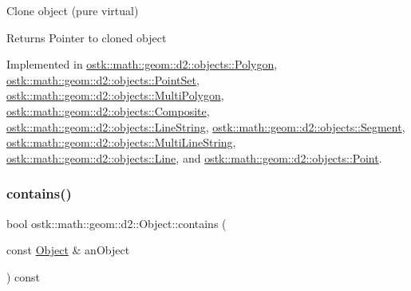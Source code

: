 Clone object (pure virtual) 

\begin{DoxyReturn}{Returns}
Pointer to cloned object 
\end{DoxyReturn}


Implemented in \hyperlink{classostk_1_1math_1_1geom_1_1d2_1_1objects_1_1_polygon_a55e4524d1f58bf8379580e63f49f0b48}{ostk\+::math\+::geom\+::d2\+::objects\+::\+Polygon}, \hyperlink{classostk_1_1math_1_1geom_1_1d2_1_1objects_1_1_point_set_ac1d1c3727df0f10f527aa3d3551c8f4e}{ostk\+::math\+::geom\+::d2\+::objects\+::\+Point\+Set}, \hyperlink{classostk_1_1math_1_1geom_1_1d2_1_1objects_1_1_multi_polygon_a89fdf23e9f496c2e5f598c0dc8981c86}{ostk\+::math\+::geom\+::d2\+::objects\+::\+Multi\+Polygon}, \hyperlink{classostk_1_1math_1_1geom_1_1d2_1_1objects_1_1_composite_a24c81b4b2b2455338590c0ae94fb0f5e}{ostk\+::math\+::geom\+::d2\+::objects\+::\+Composite}, \hyperlink{classostk_1_1math_1_1geom_1_1d2_1_1objects_1_1_line_string_abb5ac5e7e3e068c6597aab554e6a5e21}{ostk\+::math\+::geom\+::d2\+::objects\+::\+Line\+String}, \hyperlink{classostk_1_1math_1_1geom_1_1d2_1_1objects_1_1_segment_ad0ba7ee144638335e4f02da0de38beab}{ostk\+::math\+::geom\+::d2\+::objects\+::\+Segment}, \hyperlink{classostk_1_1math_1_1geom_1_1d2_1_1objects_1_1_multi_line_string_abf1b39f7e7f9c1f1ba9b040669863e81}{ostk\+::math\+::geom\+::d2\+::objects\+::\+Multi\+Line\+String}, \hyperlink{classostk_1_1math_1_1geom_1_1d2_1_1objects_1_1_line_a5c81c1f01b0372c7b0f8e597e77dad92}{ostk\+::math\+::geom\+::d2\+::objects\+::\+Line}, and \hyperlink{classostk_1_1math_1_1geom_1_1d2_1_1objects_1_1_point_a8550e9fe2c23c1f38e53093f4480598d}{ostk\+::math\+::geom\+::d2\+::objects\+::\+Point}.

\mbox{\label{classostk_1_1math_1_1geom_1_1d2_1_1_object_ad932da22ca5827ee461b822fffd413c1}} 
\subsubsection{\texorpdfstring{contains()}{contains()}}
{\footnotesize\ttfamily bool ostk\+::math\+::geom\+::d2\+::\+Object\+::contains (\begin{DoxyParamCaption}\item[{const \hyperlink{classostk_1_1math_1_1geom_1_1d2_1_1_object}{Object} \&}]{an\+Object }\end{DoxyParamCaption}) const\hspace{0.3cm}{\ttfamily [virtual]}}




